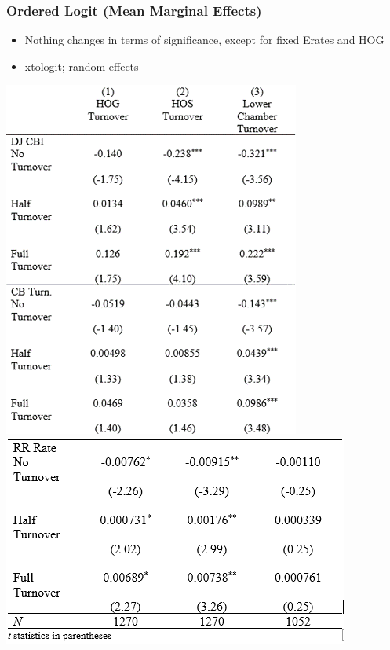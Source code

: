 \documentclass[]{beamer}
\begin{document}
\begin{frame}
\frametitle{Ordered Logit (Mean Marginal Effects)}
\begin{itemize}
\item Nothing changes in terms of significance, except for fixed Erates and HOG
\item xtologit; random effects
\end{itemize}
\includegraphics{img0003.png}
\includegraphics{img0004.png}
\end{frame}
\end{document}

